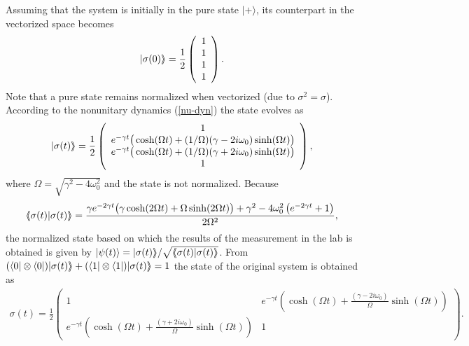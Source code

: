 \documentclass[aps,pra,twocolumn,floatfix,groupedaddress,superscriptaddress,nofootinbib,notitlepage]{revtex4-2}
\def \llangle{{\langle\hskip-1mm\langle}}
\def \rrangle{{\rangle\hskip-1mm\rangle}}
\begin{document}
 Assuming that the system is initially in the pure state $|+\rangle$, its counterpart in the vectorized space becomes 
\begin{align}
|\sigma(0)\rrangle=\frac{1}{2}\left( \begin{array}{c} 1\\ 1\\ 1\\ 1 \end{array} \right).
\end{align}
Note that a pure state remains normalized when vectorized (due to $\sigma^{2}=\sigma$). According to the nonunitary dynamics (\ref{nu-dyn}) the state evolves as 
\begin{align}
|\sigma(t)\rrangle = \frac{1}{2}\left(\begin{array}{c} 1 \\ e^{-\gamma t} \big(\cosh(\Omega t) + (1/\Omega)(\gamma -2 i \omega_{0}) \sinh(\Omega t) \big) \\  e^{-\gamma t} \big(\cosh(\Omega t) + (1/\Omega)(\gamma +2 i \omega_{0}) \sinh(\Omega t) \big) \\ 1 \end{array} \right), \end{align}
where $\Omega = \sqrt{\gamma^{2} - 4 \omega_{0}^{2}}$ and the state is not normalized. Because
\begin{equation}
\llangle \sigma(t)|\sigma(t)\rrangle=\frac{\gamma  e^{-2 \gamma t} \big(\gamma  \cosh(2\Omega t) + \Omega \sinh(2\Omega t) \big) + \gamma^{2} -4 \omega_{0}^{2} \left(e^{-2\gamma t} + 1 \right)}{2\Omega^{2}},
\end{equation}
the normalized state based on which the results of the measurement in the lab is obtained is given by $|\psi(t)\rangle= |\sigma(t) \rrangle/\sqrt{\llangle \sigma(t)|\sigma(t)\rrangle}$. From $(\langle 0| \otimes \langle 0|)|\sigma(t)\rrangle+(\langle 1|\otimes \langle 1|)|\sigma(t)\rrangle=1$ the state of the original system is obtained as 
\begin{align}
\sigma(t) = \frac{1}{2}\left( \begin{array}{cc} 1 & e^{-\gamma t} \left(\cosh(\Omega t) + \frac{(\gamma -2 i \omega_{0})}{\Omega} \sinh(\Omega t) \right) \\ e^{-\gamma t} \left(\cosh (\Omega t)+\frac{(\gamma +2 i \omega_{0})}{\Omega} \sinh(\Omega t)\right) & 1 \end{array} \right).
\end{align}

\end{document}
